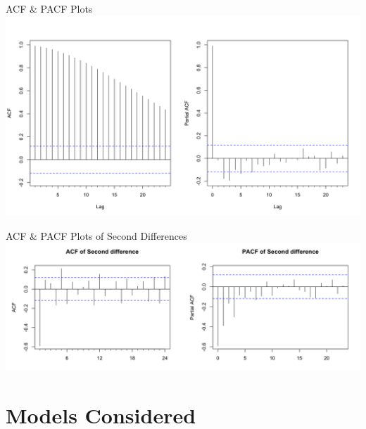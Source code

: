 \documentclass[ignorenonframetext]{beamer}
\begin{document}
  	\begin{frame}{ACF \& PACF Plots}
     	\includegraphics[width=\linewidth]{images/acfpacf}
  	\end{frame}
  
  	\begin{frame}{ACF \& PACF Plots of Second Differences}
     	\includegraphics[width=\textwidth]{images/acfpacf2d}
  	\end{frame}
  

 \section{Models Considered}
 
\end{document}
